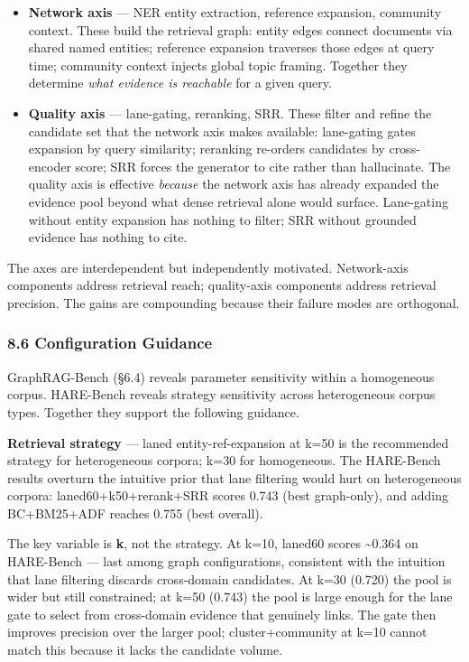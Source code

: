\documentclass[
]{article}
\begin{document}
\begin{itemize}
\item
  \textbf{Network axis} --- NER entity extraction, reference expansion,
  community context. These build the retrieval graph: entity edges
  connect documents via shared named entities; reference expansion
  traverses those edges at query time; community context injects global
  topic framing. Together they determine \emph{what evidence is
  reachable} for a given query.
\item
  \textbf{Quality axis} --- lane-gating, reranking, SRR. These filter
  and refine the candidate set that the network axis makes available:
  lane-gating gates expansion by query similarity; reranking re-orders
  candidates by cross-encoder score; SRR forces the generator to cite
  rather than hallucinate. The quality axis is effective \emph{because}
  the network axis has already expanded the evidence pool beyond what
  dense retrieval alone would surface. Lane-gating without entity
  expansion has nothing to filter; SRR without grounded evidence has
  nothing to cite.
\end{itemize}

The axes are interdependent but independently motivated. Network-axis
components address retrieval reach; quality-axis components address
retrieval precision. The gains are compounding because their failure
modes are orthogonal.

\subsubsection{8.6 Configuration Guidance}\label{configuration-guidance}

GraphRAG-Bench (§6.4) reveals parameter sensitivity within a homogeneous
corpus. HARE-Bench reveals strategy sensitivity across heterogeneous
corpus types. Together they support the following guidance.

\textbf{Retrieval strategy} --- laned entity-ref-expansion at k=50 is
the recommended strategy for heterogeneous corpora; k=30 for
homogeneous. The HARE-Bench results overturn the intuitive prior that
lane filtering would hurt on heterogeneous corpora:
laned60+k50+rerank+SRR scores 0.743 (best graph-only), and adding
BC+BM25+ADF reaches 0.755 (best overall).

The key variable is \textbf{k}, not the strategy. At k=10, laned60
scores \textasciitilde0.364 on HARE-Bench --- last among graph
configurations, consistent with the intuition that lane filtering
discards cross-domain candidates. At k=30 (0.720) the pool is wider but
still constrained; at k=50 (0.743) the pool is large enough for the lane
gate to select from cross-domain evidence that genuinely links. The gate
then improves precision over the larger pool; cluster+community at k=10
cannot match this because it lacks the candidate volume.
\end{document}
